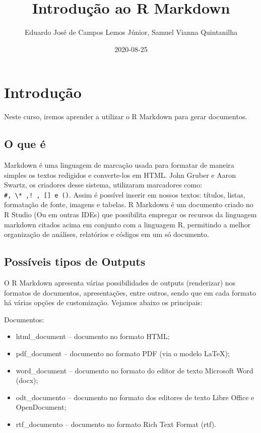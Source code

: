 \documentclass[
]{book}
\title{Introdução ao R Markdown}
\author{Eduardo José de Campos Lemos Júnior, Samuel Vianna Quintanilha}
\date{2020-08-25}
\providecommand{\tightlist}{%
  \setlength{\itemsep}{0pt}\setlength{\parskip}{0pt}}
\begin{document}
\maketitle

{
\setcounter{tocdepth}{1}
\tableofcontents
}
\hypertarget{intro}{%
\chapter{Introdução}\label{intro}}

Neste curso, iremos aprender a utilizar o R Markdown para gerar documentos.

\hypertarget{o-que-uxe9}{%
\section{O que é}\label{o-que-uxe9}}

Markdown é uma linguagem de marcação usada para formatar de maneira simples os textos redigidos e converte-los em HTML. John Gruber e Aaron Swartz, os criadores desse sistema, utilizaram marcadores como: \texttt{\#,\ \textbackslash{}*\ ,!\ ,\ {[}{]}\ e\ ()}. Assim é possível inserir em nossos textos: títulos, listas, formatação de fonte, imagens e tabelas.
R Markdown é um documento criado no R Studio (Ou em outras IDEs) que possibilita empregar os recursos da linguagem markdown citados acima em conjunto com a linguagem R, permitindo a melhor organização de análises, relatórios e códigos em um só documento.

\hypertarget{possuxedveis-tipos-de-outputs}{%
\section{Possíveis tipos de Outputs}\label{possuxedveis-tipos-de-outputs}}

O R Markdown apresenta várias possibilidades de outputs (renderizar) nos formatos de documentos, apresentações, entre outros, sendo que em cada formato há várias opções de customização. Vejamos abaixo os principais:

Documentos:

\begin{itemize}
\tightlist
\item
  html\_document -- documento no formato HTML;
\item
  pdf\_document -- documento no formato PDF (via o modelo LaTeX);
\item
  word\_document -- documento no formato do editor de texto Microsoft Word (docx);
\item
  odt\_documento -- documento no formato dos editores de texto Libre Office e OpenDocument;
\item
  rtf\_documento -- documento no formato Rich Text Format (rtf).
\end{itemize}
\end{document}
